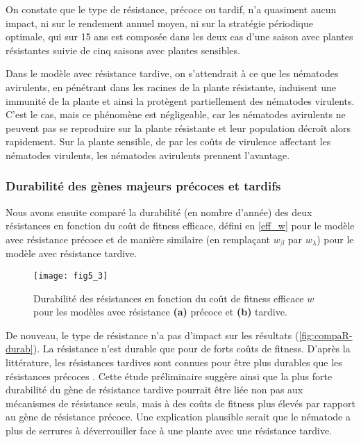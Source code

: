 	
	On constate que le type de résistance, précoce ou tardif, n'a quasiment aucun impact, ni sur le rendement annuel moyen, ni sur la stratégie périodique optimale, qui sur 15 ans est composée dans les deux cas d'une saison avec plantes résistantes suivie de cinq saisons avec plantes sensibles.
	
	Dans le modèle avec résistance tardive, on s'attendrait à ce que les nématodes avirulents, en pénétrant dans les racines de la plante résistante, induisent une immunité de la plante et ainsi la protègent partiellement des nématodes virulents. C'est le cas, mais ce phénomène est négligeable, car les nématodes avirulents ne peuvent pas se reproduire sur la plante résistante et leur population décroît alors rapidement. Sur la plante sensible, de par les coûts de virulence affectant les nématodes virulents, les nématodes avirulents prennent l'avantage.
	
\subsubsection{Durabilité des gènes majeurs précoces et tardifs}
	
	Nous avons ensuite comparé la durabilité (en nombre d'année) des deux résistances en fonction du coût de fitness efficace, défini en \eqref{eff_w} pour le modèle avec résistance précoce et de manière similaire (en remplaçant $w_{\beta}$ par $w_{\lambda}$) pour le modèle avec résistance tardive.
	
   \begin{figure}
	 \centering
	  \texttt{[image: fig5\_3]}		
	  \caption[Durabilité des résistances en fonction du coût de fitness efficace pour les modèles avec résistance 
	  précoce et tardive]{Durabilité des résistances en fonction du coût de fitness efficace $w$ pour les modèles avec 
	  résistance \textbf{(a)} précoce et \textbf{(b)} tardive.}
	  \label{fig:compaR-durab}
   \end{figure}
	 
	De nouveau, le type de résistance n'a pas d'impact sur les résultats (\autoref{fig:compaR-durab}). La résistance n'est  durable  que  pour de forts coûts de fitness. D'après la littérature, les résistances tardives sont connues pour être plus durables que les résistances précoces \cite{Castagnone-Sereno2002,Pegard2005,Djian-Caporalino2011,Barbary2014,Djian-Caporalino2014}.  Cette étude préliminaire suggère ainsi que la plus forte durabilité du gène de résistance tardive pourrait être liée non pas aux mécanismes de résistance seuls, mais à des coûts de fitness plus élevés par rapport au gène de résistance précoce.  Une explication plausible serait que le nématode a plus de \og serrures \fg{} à déverrouiller face à une plante avec une résistance tardive.
	 
